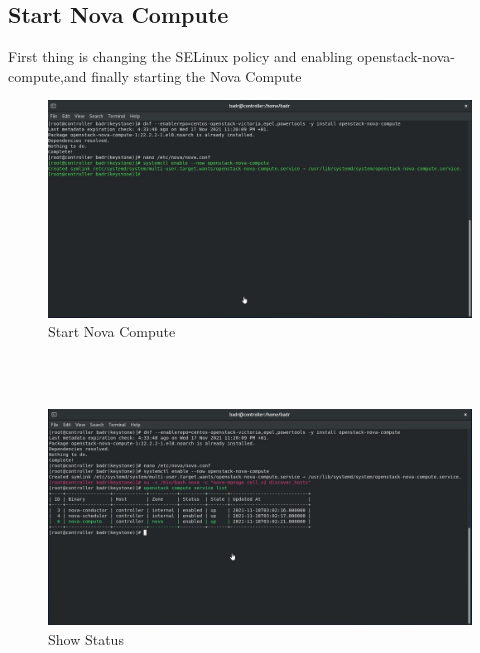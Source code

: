 \begin{spacing}{1.2}
\subsection{Start Nova Compute}

\par First thing is changing the SELinux policy and enabling openstack-nova-compute,and finally starting the Nova Compute 
\\
\begin{figure}[!htb] 
\begin{center} 
\includegraphics[width=1\linewidth]{Cloud/Installing and Configuring Nova Compute/Start Nova Compute} 
\end{center} 
\caption{Start Nova Compute} 
\end{figure} 
\FloatBarrier
\\
\\
\begin{figure}[!htb] 
\begin{center} 
\includegraphics[width=1\linewidth]{Cloud/Installing and Configuring Nova Compute/Show Status} 
\end{center} 
\caption{Show Status} 
\end{figure} 
\FloatBarrier
\\



\end{spacing}
